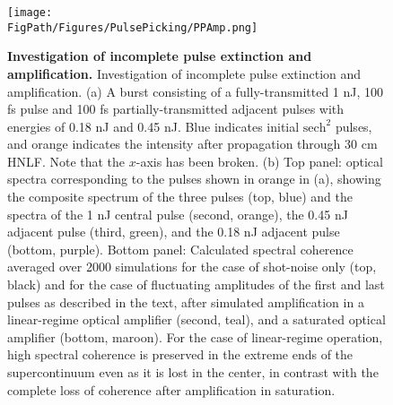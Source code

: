 \begin{figure}[htpb]
	\begin{center}
		\texttt{[image: \\FigPath/Figures/PulsePicking/PPAmp.png]}
	\end{center}
	\caption[Figure Title]{\textbf{Investigation of incomplete pulse extinction and amplification.} Investigation of incomplete pulse extinction and amplification. (a) A burst consisting of a fully-transmitted 1 nJ, 100 fs pulse and 100 fs partially-transmitted adjacent pulses with energies of 0.18 nJ and 0.45 nJ. Blue indicates initial $\mathrm{sech}^2$ pulses, and orange indicates the intensity after propagation through 30 cm HNLF. Note that the $x$-axis has been broken. (b) Top panel: optical spectra corresponding to the pulses shown in orange in (a), showing the composite spectrum of the three pulses (top, blue) and the spectra of the 1 nJ central pulse (second, orange), the 0.45 nJ adjacent pulse (third, green), and the 0.18 nJ adjacent pulse (bottom, purple). Bottom panel: Calculated spectral coherence averaged over 2000 simulations for the case of shot-noise only (top, black) and for the case of fluctuating amplitudes of the first and last pulses as described in the text, after simulated amplification in a linear-regime optical amplifier (second, teal), and a saturated optical amplifier (bottom, maroon).  For the case of linear-regime operation, high spectral coherence is preserved in the extreme ends of the supercontinuum even as it is lost in the center, in contrast with the complete loss of coherence after amplification in saturation. 
	\label{fig:PPAmp}}
\end{figure} 

